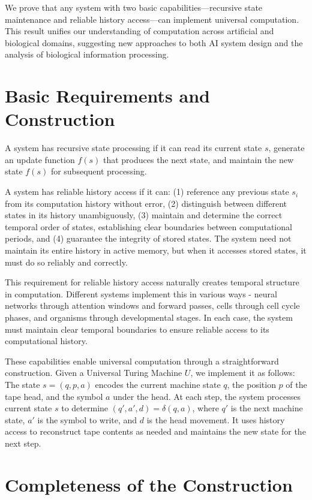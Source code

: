 \documentclass[12pt]{article}
\begin{document}
We prove that any system with two basic capabilities---recursive state maintenance and reliable history access---can implement universal computation. This result unifies our understanding of computation across artificial and biological domains, suggesting new approaches to both AI system design and the analysis of biological information processing.

\section{Basic Requirements and Construction}
A system has recursive state processing if it can read its current state $s$, generate an update function $f(s)$ that produces the next state, and maintain the new state $f(s)$ for subsequent processing.

A system has reliable history access if it can: (1) reference any previous state $s_i$ from its computation history without error, (2) distinguish between different states in its history unambiguously, (3) maintain and determine the correct temporal order of states, establishing clear boundaries between computational periods, and (4) guarantee the integrity of stored states. The system need not maintain its entire history in active memory, but when it accesses stored states, it must do so reliably and correctly.

This requirement for reliable history access naturally creates temporal structure in computation. Different systems implement this in various ways - neural networks through attention windows and forward passes, cells through cell cycle phases, and organisms through developmental stages. In each case, the system must maintain clear temporal boundaries to ensure reliable access to its computational history.

These capabilities enable universal computation through a straightforward construction. Given a Universal Turing Machine $U$, we implement it as follows: The state $s = (q, p, a)$ encodes the current machine state $q$, the position $p$ of the tape head, and the symbol $a$ under the head. At each step, the system processes current state $s$ to determine $(q', a', d) = \delta(q, a)$, where $q'$ is the next machine state, $a'$ is the symbol to write, and $d$ is the head movement. It uses history access to reconstruct tape contents as needed and maintains the new state for the next step.

\section{Completeness of the Construction}
\end{document}
